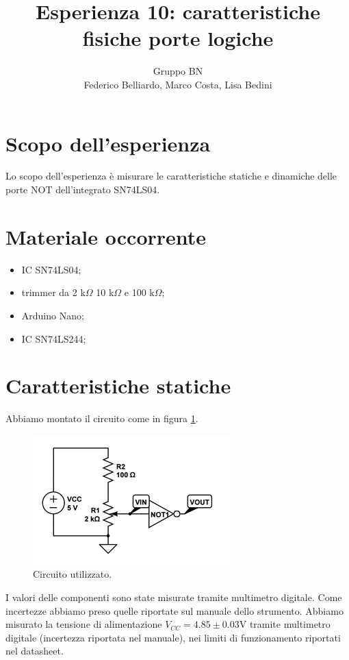 \documentclass[10pt,a4paper]{article}
\author{Gruppo BN \\ Federico Belliardo, Marco Costa, Lisa Bedini}
\title{Esperienza 10: caratteristiche fisiche porte logiche}
\begin{document}
\maketitle

\section{Scopo dell'esperienza}
Lo scopo dell'esperienza è misurare le caratteristiche statiche e dinamiche delle porte NOT dell'integrato SN74LS04.

\section{Materiale occorrente}
\begin{itemize}
\item IC SN74LS04;
\item trimmer da 2 k$\Omega$ 10 k$\Omega$ e 100 k$\Omega$;
\item Arduino Nano;
\item IC SN74LS244;
\end{itemize}

\section{Caratteristiche statiche}
Abbiamo montato il circuito come in figura \ref{fig:circuito}.
\begin{figure}
\centering
\includegraphics[scale=0.7]{circuito.png}
\caption{Circuito utilizzato.\label{fig:circuito}}
\end{figure}
I valori delle componenti sono state misurate tramite multimetro digitale. Come incertezze abbiamo preso quelle riportate sul manuale dello strumento.
Abbiamo misurato la tensione di alimentazione $V_{CC}=4.85\pm 0.03$V tramite multimetro digitale (incertezza riportata nel manuale), nei limiti di funzionamento riportati nel datasheet.
\end{document}
